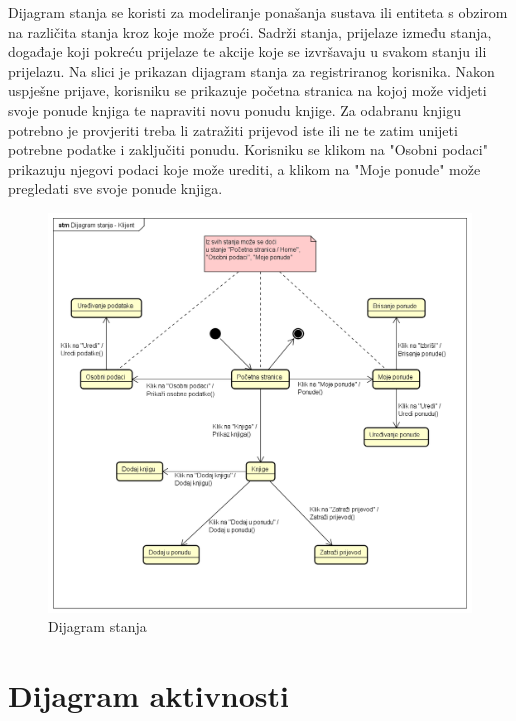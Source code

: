 			
			Dijagram stanja se koristi za modeliranje ponašanja sustava ili entiteta s obzirom na različita stanja kroz koje može proći. Sadrži stanja, prijelaze između stanja, događaje koji pokreću prijelaze te akcije koje se izvršavaju u svakom stanju ili prijelazu. Na slici je prikazan dijagram stanja za registriranog korisnika. Nakon uspješne prijave, korisniku se prikazuje početna stranica na kojoj može vidjeti svoje ponude knjiga te napraviti novu ponudu knjige. Za odabranu knjigu potrebno je provjeriti treba li zatražiti prijevod iste ili ne te zatim unijeti potrebne podatke i zaključiti ponudu. Korisniku se klikom na "Osobni podaci" prikazuju njegovi podaci koje može urediti, a klikom na "Moje ponude" može pregledati sve svoje ponude knjiga.
			
			\eject
			
			
			\begin{figure}[H]
				\includegraphics[width=\textwidth]{dijagrami/Dijagram stanja.PNG} %
				\centering
				\caption{Dijagram stanja }
				\label{fig:dijagramstanja1}
			\end{figure} 
			
			
			\eject 
		
		\section{Dijagram aktivnosti}
			
